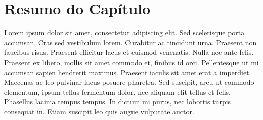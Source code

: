 \section{Resumo do Capítulo}
\label{mtd-resumo}

Lorem ipsum dolor sit amet, consectetur adipiscing elit. Sed scelerisque porta accumsan. Cras sed vestibulum lorem. Curabitur ac tincidunt urna. Praesent non faucibus risus. Praesent efficitur lacus et euismod venenatis. Nulla nec ante felis. Praesent ex libero, mollis sit amet commodo et, finibus id orci. Pellentesque ut mi accumsan sapien hendrerit maximus. Praesent iaculis sit amet erat a imperdiet. Maecenas ac leo pulvinar lacus posuere pharetra. Sed suscipit, arcu ut commodo elementum, ipsum tellus fermentum dolor, nec aliquam elit tellus et felis. Phasellus lacinia tempus tempus. In dictum mi purus, nec lobortis turpis consequat in. Etiam suscipit leo quis augue vulputate auctor.